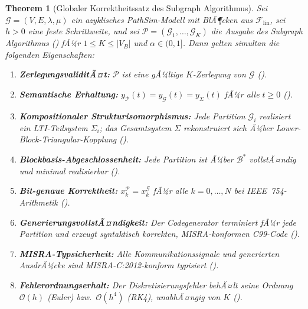 ﻿\documentclass[12pt,a4paper]{article}
\newtheorem{theorem}{Theorem}[section]
\theoremstyle{definition}
\begin{document}
\begin{theorem}[Globaler Korrektheitssatz des Subgraph Algorithmus]
\label{thm:subgraph-global}
Sei $\mathcal{G} = (V, E, \lambda, \mu)$ ein azyklisches PathSim-Modell
mit BlÃ¶cken aus $\mathcal{F}_{\mathrm{lin}}$, sei $h > 0$ eine feste
Schrittweite, und sei
$\mathcal{P} = (\mathcal{G}_1, \ldots, \mathcal{G}_K)$
die Ausgabe des Subgraph Algorithmus () fÃ¼r
$1 \leq K \leq |V_B|$ und $\alpha \in (0,1]$.
Dann gelten simultan die folgenden Eigenschaften:

\begin{enumerate}[label=\textbf{(P\arabic*)}]
  \item \textbf{ZerlegungsvaliditÃ¤t:} $\mathcal{P}$ ist eine gÃ¼ltige
        $K$-Zerlegung von $\mathcal{G}$ ().

  \item \textbf{Semantische Erhaltung:}
        $y_{\mathcal{P}}(t) = y_{\mathcal{G}}(t) = y_{\Sigma}(t)$
        fÃ¼r alle $t \geq 0$
        ().

  \item \textbf{Kompositionaler Strukturisomorphismus:}
        Jede Partition $\mathcal{G}_i$ realisiert ein LTI-Teilsystem
        $\Sigma_i$; das Gesamtsystem $\Sigma$ rekonstruiert sich Ã¼ber
        Lower-Block-Triangular-Kopplung ().

  \item \textbf{Blockbasis-Abgeschlossenheit:}
        Jede Partition ist Ã¼ber $\mathcal{B}^*$ vollstÃ¤ndig und minimal
        realisierbar ().

  \item \textbf{Bit-genaue Korrektheit:}
        $x_k^{\mathcal{P}} = x_k^{\mathcal{G}}$ fÃ¼r alle $k = 0, \ldots, N$
        bei IEEE~754-Arithmetik ().

  \item \textbf{GenerierungsvollstÃ¤ndigkeit:}
        Der Codegenerator terminiert fÃ¼r jede Partition und erzeugt
        syntaktisch korrekten, MISRA-konformen C99-Code
        ().

  \item \textbf{MISRA-Typsicherheit:}
        Alle Kommunikationssignale und generierten AusdrÃ¼cke sind
        MISRA-C:2012-konform typisiert
        ().

  \item \textbf{Fehlerordnungserhalt:}
        Der Diskretisierungsfehler behÃ¤lt seine Ordnung
        $\mathcal{O}(h)$ (Euler) bzw.\ $\mathcal{O}(h^4)$ (RK4),
        unabhÃ¤ngig von $K$
        ().


\end{enumerate}
\end{theorem}
\end{document}
